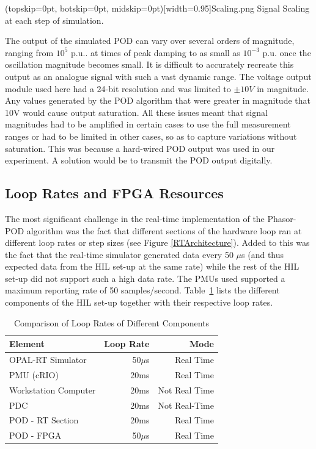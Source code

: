 \documentclass{ieeeaccess}
\begin{document}
\Figure[tbp!](topskip=0pt, botskip=0pt, midskip=0pt)[width=0.95\columnwidth]{Scaling.png}
{Signal Scaling at each step of simulation.\label{ScalingProblem}}

The output of the simulated POD can vary over several orders of magnitude, ranging from $10^{5}$ p.u.. at times of peak damping to as small as $10^{-3}$ p.u. once the oscillation magnitude  becomes small. It is difficult to accurately recreate this output as an analogue signal with such a vast dynamic range. The voltage output module used here had a 24-bit resolution and was limited to $\pm 10V$ in magnitude. Any values generated by the POD algorithm that were greater in magnitude that 10V would cause output saturation. All these issues meant that signal magnitudes had to be amplified in certain cases to use the full measurement ranges or had to be limited in other cases, so as to capture variations without saturation. This was because a hard-wired POD output was used in our experiment. A solution would be to transmit the POD output digitally.

\subsection{Loop Rates and FPGA Resources}\label{looprate}
The most significant challenge in the real-time implementation of the Phasor-POD algorithm was the fact that different sections of the hardware loop ran at different loop rates or step sizes (see Figure \ref{RTArchitecture}). Added to this was the fact that the real-time simulator generated data every 50 $\mu$s (and thus expected data from the HIL set-up at the same rate) while the rest of the HIL set-up did not support such a high data rate. The PMUs used supported a maximum reporting rate of 50 samples/second. Table~\ref{ex:LoopRates} lists the different components of the HIL set-up together with their respective loop rates.
\begin{table}[htpb]
\caption{Comparison of Loop Rates of Different Components}\label{ex:LoopRates}
\begin{center}
\begin{tabular}{|l|r|r|}
\hline \textbf{Element} & \textbf{Loop Rate} & \textbf{Mode} \\
\hline OPAL-RT Simulator & 50$\mu$s & Real Time \\ 
\hline PMU (cRIO) & 20ms & Real Time \\ 
\hline Workstation Computer& 20ms &Not Real Time\\ 
\hline PDC & 20ms &Not Real-Time\\ %
\hline POD - RT Section & 20ms & Real Time \\ 
\hline POD - FPGA & 50$\mu$s & Real Time \\ 
\hline 
\end{tabular}
\end{center}
\end{table} 
\end{document}
